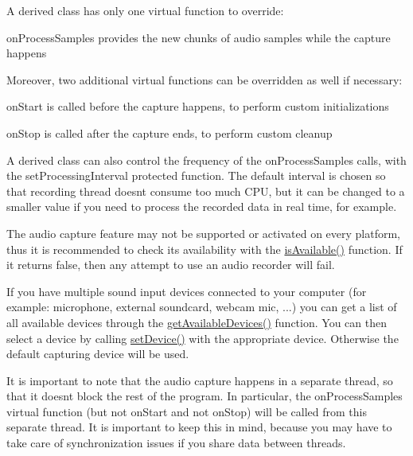 A derived class has only one virtual function to override\+: \begin{DoxyItemize}
\item on\+Process\+Samples provides the new chunks of audio samples while the capture happens\end{DoxyItemize}
Moreover, two additional virtual functions can be overridden as well if necessary\+: \begin{DoxyItemize}
\item on\+Start is called before the capture happens, to perform custom initializations \item on\+Stop is called after the capture ends, to perform custom cleanup\end{DoxyItemize}
A derived class can also control the frequency of the on\+Process\+Samples calls, with the set\+Processing\+Interval protected function. The default interval is chosen so that recording thread doesn\textquotesingle{}t consume too much C\+PU, but it can be changed to a smaller value if you need to process the recorded data in real time, for example.

The audio capture feature may not be supported or activated on every platform, thus it is recommended to check its availability with the \hyperlink{classsf_1_1SoundRecorder_aab2bd0fee9e48d6cfd449b1cb078ce5a}{is\+Available()} function. If it returns false, then any attempt to use an audio recorder will fail.

If you have multiple sound input devices connected to your computer (for example\+: microphone, external soundcard, webcam mic, ...) you can get a list of all available devices through the \hyperlink{classsf_1_1SoundRecorder_a26198c5c11efcd61f426f326fe314afe}{get\+Available\+Devices()} function. You can then select a device by calling \hyperlink{classsf_1_1SoundRecorder_a8eb3e473292c16e874322815836d3cd3}{set\+Device()} with the appropriate device. Otherwise the default capturing device will be used.

It is important to note that the audio capture happens in a separate thread, so that it doesn\textquotesingle{}t block the rest of the program. In particular, the on\+Process\+Samples virtual function (but not on\+Start and not on\+Stop) will be called from this separate thread. It is important to keep this in mind, because you may have to take care of synchronization issues if you share data between threads.


